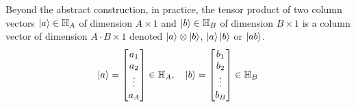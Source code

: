 Beyond the abstract construction, in practice, the tensor product of two column vectors $\ket{a}\in \mathbb{H}_A$ of dimension $A \times 1$ and $\ket{b}\in \mathbb{H}_B$ of dimension $B \times 1$ is a column vector of dimension $A\cdot B \times 1$ denoted $\ket{a}\otimes \ket{b}$, $\ket{a}\ket{b}$ or $\ket{ab}$.
\begin{equation}
    \ket{a}=\begin{bmatrix}
        a_1 \\
        a_2 \\
        \vdots \\
        a_A
    \end{bmatrix} \in \mathbb{H}_A , \quad
    \ket{b}=\begin{bmatrix}
        b_1 \\
        b_2 \\
        \vdots \\
        b_B
    \end{bmatrix} \in \mathbb{H}_B
\end{equation}
